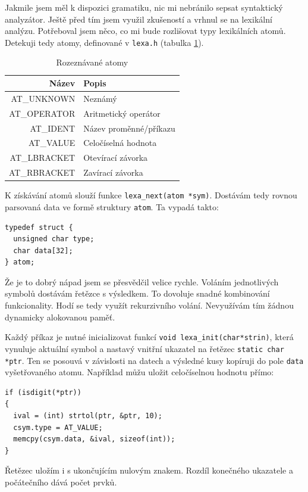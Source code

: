 \documentclass[a4paper, 12pt]{article}
\begin{document}
Jakmile jsem měl k dispozici gramatiku, nic mi nebránilo sepsat
syntaktický analyzátor. Ještě před tím jsem využil zkušeností a vrhnul
se na lexikální analýzu.  Potřeboval jsem něco, co mi bude rozlišovat
typy lexikálních atomů. Detekuji tedy atomy, definované v
\texttt{lexa.h} (tabulka \ref{tab:atom}).

\begin{table}
\centering
\begin{tabular}{|r|l|}
\hline
Název & Popis\\ \hline\hline
AT\_UNKNOWN & Neznámý\\ \hline
AT\_OPERATOR & Aritmetický operátor\\ \hline
AT\_IDENT & Název proměnné/příkazu\\ \hline
AT\_VALUE & Celočíselná hodnota\\ \hline
AT\_LBRACKET & Otevírací závorka\\ \hline
AT\_RBRACKET & Zavírací závorka\\
\hline
\end{tabular}
\caption{Rozeznávané atomy}
\label{tab:atom}
\end{table}

K získávání atomů slouží funkce \verb+lexa_next(atom *sym)+.  Dostávám
tedy rovnou parsovaná data ve formě struktury \texttt{atom}.  Ta
vypadá takto:
\begin{lstlisting}
typedef struct {
  unsigned char type;
  char data[32];
} atom;
\end{lstlisting}

Že je to dobrý nápad jsem se přesvědčil velice rychle. Voláním
jednotlivých symbolů dostávám řetězce s výsledkem. To dovoluje
snadné kombinování funkcionality. Hodí se tedy využít rekurzivního
volání. Nevyužívám tím žádnou dynamicky alokovanou paměť.

Každý příkaz je nutné inicializovat funkcí \verb+void lexa_init(char*strin)+,
která vynuluje aktuální symbol a nastavý vnitřní ukazatel na
řetězec \texttt{static char *ptr}. Ten se posouvá v závislosti na
datech a výsledné kusy kopíruji do pole \texttt{data} vyšetřovaného
atomu. Například můžu uložit celočíselnou hodnotu přímo:

\begin{lstlisting}
if (isdigit(*ptr))
{
  ival = (int) strtol(ptr, &ptr, 10);
  csym.type = AT_VALUE;
  memcpy(csym.data, &ival, sizeof(int));
}
\end{lstlisting}

Řetězec uložím i s ukončujícím nulovým znakem.
Rozdíl konečného ukazatele a počátečního dává počet prvků.
\end{document}
